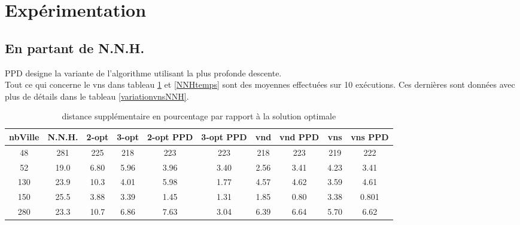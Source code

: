 \documentclass[12pt,a4paper]{article}
\begin{document}
\section{Expérimentation}
\subsection{En partant de N.N.H.}
PPD designe la variante de l'algorithme utilisant la plus profonde descente.\\
Tout ce qui concerne le vns dans tableau \ref{NNHpourcentageperf} et \ref{NNHtemps} sont des moyennes effectuées sur 10 exécutions. Ces dernières sont données avec plus de détails dans le tableau \ref{variationvnsNNH}.\\

\begin{table}[!h]
\centering
\begin{tabular}{|*{10}{c|}}
  \hline
  nbVille & N.N.H. & 2-opt & 3-opt & 2-opt PPD & 3-opt PPD & vnd & vnd PPD & vns & vns PPD \\
  \hline
  48 & 281 & 225 & 218 & 223 & 223 & 218 & 223 & 219 & 222 \\
  52 & 19.0 & 6.80 & 5.96 & 3.96 & 3.40 & 2.56 & 3.41 & 4.23 & 3.41 \\
  130 & 23.9 & 10.3 & 4.01 & 5.98 & 1.77 & 4.57 & 4.62 & 3.59 & 4.61 \\
  150 & 25.5 & 3.88 & 3.39 & 1.45 & 1.31 & 1.85 & 0.80 & 3.38 & 0.801 \\
  280 & 23.3 & 10.7 & 6.86 & 7.63 & 3.04 & 6.39 & 6.64 & 5.70 & 6.62 \\
  \hline
\end{tabular}
\caption{distance supplémentaire en pourcentage par rapport à la solution optimale}
\label{NNHpourcentageperf}
\end{table}
\end{document}
